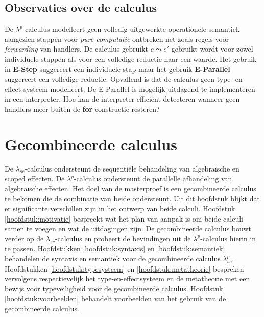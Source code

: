 \subsection{Observaties over de calculus}
De $\lambda^p$-calculus modelleert geen volledig uitgewerkte operationele semantiek aangezien stappen voor \emph{pure computatie} ontbreken net zoals regels voor \emph{forwarding} van handlers. De calculus gebruikt $e \leadsto e'$ gebruikt wordt voor zowel individuele stappen als voor een volledige reductie naar een waarde. Het gebruik in \textbf{E-Step} suggereert een individuele stap maar het gebruik \textbf{E-Parallel} suggereert een volledige reductie. \newline
Opvallend is dat de calculus geen type- en effect-systeem modelleert. \newline
De E-Parallel is mogelijk uitdagend te implementeren in een interpreter. Hoe kan de interpreter efficiënt detecteren wanneer geen handlers meer buiten de \textbf{for} constructie resteren?

\section{Gecombineerde calculus}
De $\lambda_{sc}$-calculus ondersteunt de sequentiële behandeling van algebraïsche en scoped effecten. De $\lambda^{p}$-calculus ondersteunt de parallelle afhandeling van algebraïsche effecten. Het doel van de masterproef is een gecombineerde calculus te bekomen die de combinatie van beide ondersteunt. Uit dit hoofdstuk blijkt dat er significante verschillen zijn in het ontwerp van beide calculi. \newline 
Hoofdstuk \ref{hoofdstuk:motivatie} bespreekt wat het plan van aanpak is om beide calculi samen te voegen en wat de uitdagingen zijn. De gecombineerde calculus bouwt verder op de $\lambda_{sc}$-calculus en probeert de bevindingen uit de $\lambda^p$-calculus hierin in te passen. \newline
Hoofdstukken \ref{hoofdstuk:syntaxis} en \ref{hoofdstuk:semantiek} behandelen de syntaxis en semantiek voor de gecombineerde calculus $\lambda_{sc}^{p}$. \newline
Hoofdstukken \ref{hoofdstuk:typesysteem} en \ref{hoofdstuk:metatheorie} bespreken vervolgens respectievelijk het type-en-effectsysteem en de metatheorie met een bewijs voor typeveiligheid voor de gecombineerde calculus. Hoofdstuk \ref{hoofdstuk:voorbeelden} behandelt voorbeelden van het gebruik van de gecombineerde calculus.

